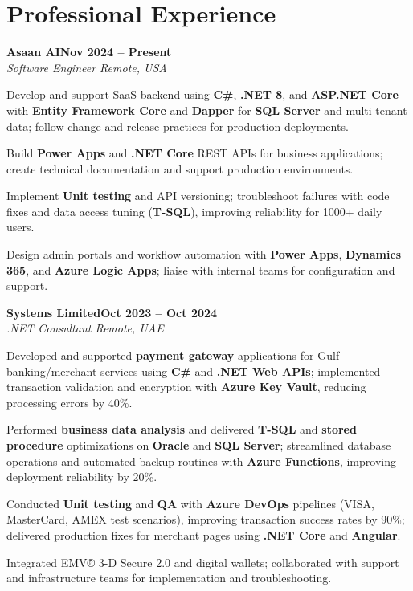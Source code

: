 \documentclass[letterpaper,10pt]{article}
\newcommand{\headingBf}[2]{
  \hspace{10pt}\textbf{#1}\hfill\textbf{#2}\\
}
\newcommand{\headingIt}[2]{
  \hspace{10pt}\textit{#1}\hfill\textit{#2}\\
}
\newenvironment{resume_list}{
  \vspace{-7pt}
  \begin{itemize}[itemsep=-2px, parsep=1pt, leftmargin=30pt]
}{
  \end{itemize}
}
\begin{document}
\section{Professional Experience}

\headingBf{Asaan AI}{Nov 2024 -- Present}
\headingIt{Software Engineer \hfill Remote, USA}{}
\begin{resume_list}
    \item Develop and support SaaS backend using \textbf{C\#}, \textbf{.NET 8}, and \textbf{ASP.NET Core} with \textbf{Entity Framework Core} and \textbf{Dapper} for \textbf{SQL Server} and multi-tenant data; follow change and release practices for production deployments.
    \item Build \textbf{Power Apps} and \textbf{.NET Core} REST APIs for business applications; create technical documentation and support production environments.
    \item Implement \textbf{Unit testing} and API versioning; troubleshoot failures with code fixes and data access tuning (\textbf{T-SQL}), improving reliability for 1000+ daily users.
    \item Design admin portals and workflow automation with \textbf{Power Apps}, \textbf{Dynamics 365}, and \textbf{Azure Logic Apps}; liaise with internal teams for configuration and support.
\end{resume_list}

\headingBf{Systems Limited}{Oct 2023 -- Oct 2024}
\headingIt{.NET Consultant \hfill Remote, UAE}{}
\begin{resume_list}
    \item Developed and supported \textbf{payment gateway} applications for Gulf banking/merchant services using \textbf{C\#} and \textbf{.NET Web APIs}; implemented transaction validation and encryption with \textbf{Azure Key Vault}, reducing processing errors by 40\%.
    \item Performed \textbf{business data analysis} and delivered \textbf{T-SQL} and \textbf{stored procedure} optimizations on \textbf{Oracle} and \textbf{SQL Server}; streamlined database operations and automated backup routines with \textbf{Azure Functions}, improving deployment reliability by 20\%.
    \item Conducted \textbf{Unit testing} and \textbf{QA} with \textbf{Azure DevOps} pipelines (VISA, MasterCard, AMEX test scenarios), improving transaction success rates by 90\%; delivered production fixes for merchant pages using \textbf{.NET Core} and \textbf{Angular}.
    \item Integrated EMV® 3-D Secure 2.0 and digital wallets; collaborated with support and infrastructure teams for implementation and troubleshooting.
\end{resume_list}
\end{document}
